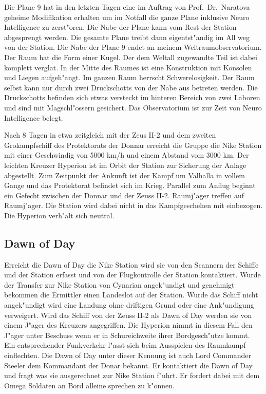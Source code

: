 Die Plane 9 hat in den letzten Tagen eine im Auftrag von Prof.~Dr.~Naratova geheime Modifikation erhalten um im Notfall die ganze Plane inklusive Neuro Intelligence zu zerst"oren. Die Nabe der Plane kann vom Rest der Station abgesprengt werden. Die gesamte Plane treibt dann eigentst"andig im All weg von der Station. Die Nabe der Plane 9 endet an meinem Weltraumobservatorium. Der Raum hat die Form einer Kugel. Der dem Weltall zugewandte Teil ist dabei komplett vergla\3t. In der Mitte des Raumes ist eine Konstruktion mit Konsolen und Liegen aufgeh"angt. Im ganzen Raum herrscht Schwerelosigkeit. Der Raum selbst kann nur durch zwei Druckschotts von der Nabe aus betreten werden. Die Druckschotts befinden sich etwas versteckt im hinteren Bereich von zwei Laboren und sind mit Magschl"ossern gesichert. Das Observatorium ist zur Zeit von Neuro Intelligence belegt. 



Nach 8 Tagen in etwa zeitgleich mit der Zeus II-2 und dem zweiten Gro\3kampfschiff des Protektorats der Donnar erreicht die Gruppe die Nike Station mit einer Geschwindig von 5000 km/h und einem Abstand vom 3000 km. Der leichten Kreuzer Hyperion ist im Orbit der Station zur Sicherung der Anlage abgestellt. Zum Zeitpunkt der Ankunft ist der Kampf um Valhalla in vollem Gange und das Protektorat befindet sich im Krieg. Parallel zum Anflug beginnt ein Gefecht zwischen der Donnar und der Zeuss II-2. Raumj"ager treffen auf Raumj"ager. Die Station wird dabei nicht in das Kampfgeschehen mit einbezogen. Die Hyperion verh"alt sich neutral.

\subsection{Dawn of Day}
Erreicht die Dawn of Day die Nike Station wird sie von den Scannern der Schiffe und der Station erfasst und von der Flugkontrolle der Station kontaktiert. Wurde der Transfer zur Nike Station von Cynarian angek"undigt und genehmigt bekommen die Ermittler einen Landeslot auf der Station. Wurde das Schiff nicht angek"undigt wird eine Landung ohne driftigen Grund oder eine Ank"undigung verweigert. Wird das Schiff von der Zeuss II-2 als Dawn of Day werden sie von einem J"ager des Kreuzers angegriffen. Die Hyperion nimmt in diesem Fall den J"ager unter Beschuss wenn er in Schu\3reichweite ihrer Bordgesch"utze kommt. Ein entsprechender Funkverkehr l"asst sich beim Ausspielen des Raumkampf einflechten. Die Dawn of Day unter dieser Kennung ist auch Lord Commander Steeler dem Kommandant der Donar bekannt. Er kontaktiert die Dawn of Day und fragt was sie ausgerechnet zur Nike Station f"uhrt. Er fordert dabei mit dem Omega Soldaten an Bord alleine sprechen zu k"onnen.

